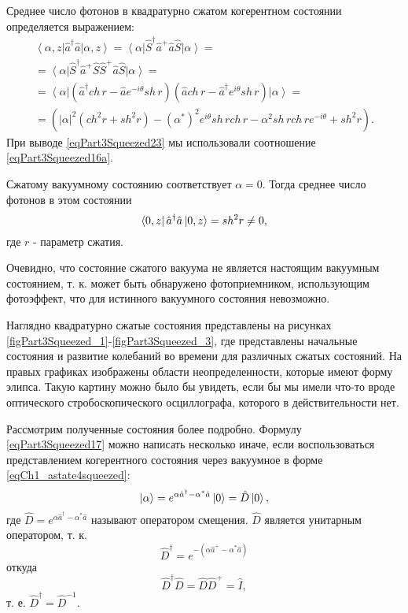Среднее число фотонов в квадратурно сжатом когерентном состоянии
определяется выражением:
\begin{eqnarray}
\left<\alpha, z\right|\hat{a}^{\dag}\hat{a}\left|\alpha, z\right> =
\left<\alpha\right|\hat{S}^{\dag}\hat{a}^{+}\hat{a}\hat{S}\left|\alpha\right>
=
\nonumber \\
=
\left<\alpha\right|\hat{S}^{\dag}\hat{a}^{+}\hat{S}\hat{S}^{+}\hat{a}\hat{S}\left|\alpha\right>
= 
\nonumber \\
=
\left<\alpha\right|
\left(\hat{a}^{\dag} ch\,r - \hat{a}e^{-i\theta}sh\,r\right)
\left(\hat{a} ch\,r - \hat{a}^{\dag} e^{i\theta}sh\,r\right)
\left|\alpha\right> = 
\nonumber \\
=
\left(
\left|\alpha\right|^2\left(ch^2 r + sh^2 r\right) -
\left(\alpha^{*}\right)^2
e^{i\theta} sh\,r ch\,r - 
\alpha^2 sh\,r ch\,r e^{- i\theta} + sh^2 r
\right).
\label{eqPart3Squeezed23}
\end{eqnarray}
При выводе \eqref{eqPart3Squeezed23} мы использовали соотношение
\eqref{eqPart3Squeezed16a}.

Сжатому вакуумному состоянию соответствует $\alpha = 0$. Тогда среднее
число фотонов в этом состоянии
\begin{equation}
\bra{0, z}\hat{a}^{\dag}\hat{a}\ket{0, z} =
sh^2 r \ne 0,
\label{eqPart3Squeezed24}
\end{equation}
где $r$ - параметр сжатия.

Очевидно, что состояние сжатого вакуума не является настоящим
вакуумным состоянием, т. к. может быть обнаружено фотоприемником,
использующим фотоэффект, что для истинного вакуумного состояния
невозможно.




%
%

Наглядно квадратурно сжатые  состояния представлены на рисунках
\ref{figPart3Squeezed_1}-\ref{figPart3Squeezed_3}, где представлены
начальные состояния и развитие колебаний во 
времени для различных сжатых состояний. На правых графиках изображены
области неопределенности, которые имеют форму элипса. Такую картину
можно было бы увидеть, если бы мы имели что-то вроде оптического
стробоскопического осциллографа, которого в действительности нет.

Рассмотрим полученные состояния более подробно. Формулу
\eqref{eqPart3Squeezed17} можно написать несколько иначе, если
воспользоваться представлением когерентного состояния через вакуумное
в форме \eqref{eqCh1_astate4squeezed}:
\begin{equation}
\left|\alpha\right> =  
e^{\alpha \hat{a}^{\dag} - \alpha^{*} \hat{a}}\ket{0} = 
\hat{D}\ket{0},
\nonumber
\end{equation}
где $\hat{D} = e^{\alpha \hat{a}^{\dag} - \alpha^{*} \hat{a}}$ называют
оператором смещения. $\hat{D}$ является унитарным оператором, т. к. 
\[
\hat{D}^{\dag} = e^{-\left(\alpha \hat{a}^{+} - \alpha^{*} \hat{a}\right)}
\]
откуда
\[
\hat{D}^{\dag} \hat{D} = \hat{D} \hat{D}^{+} =\hat{I},
\]
т. е. $\hat{D}^{\dag} = \hat{D}^{-1}$.

